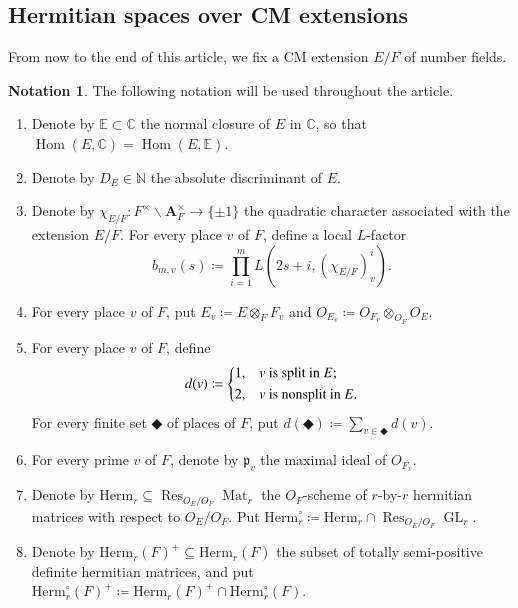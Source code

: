 \documentclass[12pt]{amsart}
\numberwithin{equation}{section}
\theoremstyle{plain}
\theoremstyle{definition}
\newtheorem{notation}[proposition]{Notation}
\theoremstyle{remark}
\renewcommand{\b}[1]{\mathbf{#1}}
\renewcommand{\d}[1]{\mathbb{#1}}
\newcommand{\f}[1]{\mathfrak{#1}}
\renewcommand{\r}[1]{\mathrm{#1}}
\renewcommand{\(}{\left(}
\renewcommand{\)}{\right)}
\newcommand{\bA}{\b A}
\newcommand{\dC}{\d C}
\newcommand{\dE}{\d E}
\newcommand{\dN}{\d N}
\newcommand{\fp}{\f p}
\newcommand{\Herm}{\r{Herm}}
\DeclareMathOperator{\GL}{GL}
\DeclareMathOperator{\Hom}{Hom}
\DeclareMathOperator{\Mat}{Mat}
\DeclareMathOperator{\Res}{Res}
\begin{document}
\subsection{Hermitian spaces over CM extensions}
\label{ss:hermitian_space}


From now to the end of this article, we fix a CM extension $E/F$ of number fields.

\begin{notation}\label{no:cm}
The following notation will be used throughout the article.
\begin{enumerate}
  \item Denote by $\dE\subset\dC$ the normal closure of $E$ in $\dC$, so that $\Hom(E,\dC)=\Hom(E,\dE)$.

  \item Denote by $D_E\in\dN$ the absolute discriminant of $E$.

  \item Denote by $\chi_{E/F}\colon F^\times\backslash\bA_F^\times\to\{\pm 1\}$ the quadratic character associated with the extension $E/F$. For every place $v$ of $F$, define a local $L$-factor
      \[
      b_{m,v}(s)\coloneqq\prod_{i=1}^m L(2s+i,(\chi_{E/F})_v^i).
      \]

  \item For every place $v$ of $F$, put $E_v\coloneqq E\otimes_FF_v$ and $O_{E_v}\coloneqq O_{F_v}\otimes_{O_F}O_E$.

  \item For every place $v$ of $F$, define
      \[
      d(v)\coloneqq
      \begin{dcases}
      1,&\text{$v$ is split in $E$;}\\
      2,&\text{$v$ is nonsplit in $E$.}
      \end{dcases}
      \]
      For every finite set $\Diamondblack$ of places of $F$, put $d(\Diamondblack)\coloneqq\sum_{v\in\Diamondblack}d(v)$.

  \item For every prime $v$ of $F$, denote by $\fp_v$ the maximal ideal of $O_{F_v}$.

  \item Denote by $\Herm_r\subseteq\Res_{O_E/O_F}\Mat_r$ the $O_F$-scheme of $r$-by-$r$ hermitian matrices with respect to $O_E/O_F$. Put $\Herm^\circ_r\coloneqq\Herm_r\cap\Res_{O_E/O_F}\GL_r$.

  \item Denote by $\Herm_r(F)^+\subseteq\Herm_r(F)$ the subset of totally semi-positive definite hermitian matrices, and put $\Herm_r^\circ(F)^+\coloneqq\Herm_r(F)^+\cap\Herm_r^\circ(F)$.
\end{enumerate}
\end{notation}
\end{document}
